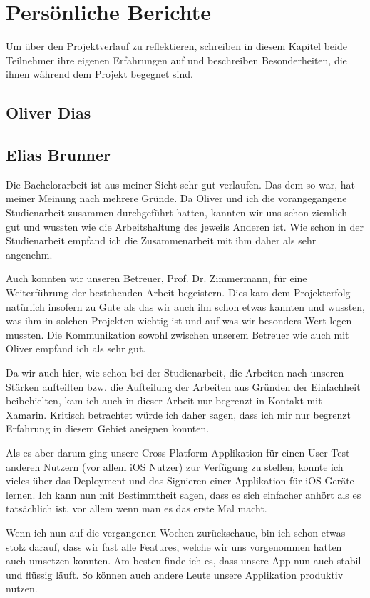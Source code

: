 \section{Persönliche Berichte}
Um über den Projektverlauf zu reflektieren, schreiben in diesem Kapitel beide Teilnehmer ihre eigenen Erfahrungen auf und beschreiben Besonderheiten, die ihnen während dem Projekt begegnet sind. 

\subsection{Oliver Dias}

\subsection{Elias Brunner}
Die Bachelorarbeit ist aus meiner Sicht sehr gut verlaufen. Das dem so war, hat meiner Meinung nach mehrere Gründe. Da Oliver und ich die vorangegangene Studienarbeit zusammen durchgeführt hatten, kannten wir uns schon ziemlich gut und wussten wie die Arbeitshaltung des jeweils Anderen ist. Wie schon in der Studienarbeit empfand ich die Zusammenarbeit mit ihm daher als sehr angenehm.

Auch konnten wir unseren Betreuer, Prof. Dr. Zimmermann, für eine Weiterführung der bestehenden Arbeit begeistern. Dies kam dem Projekterfolg natürlich insofern zu Gute als das wir auch ihn schon etwas kannten und wussten, was ihm in solchen Projekten wichtig ist und auf was wir besonders Wert legen mussten. Die Kommunikation sowohl zwischen unserem Betreuer wie auch mit Oliver empfand ich als sehr gut.

Da wir auch hier, wie schon bei der Studienarbeit, die Arbeiten nach unseren Stärken aufteilten bzw. die Aufteilung der Arbeiten aus Gründen der Einfachheit beibehielten, kam ich auch in dieser Arbeit nur begrenzt in Kontakt mit Xamarin. Kritisch betrachtet würde ich daher sagen, dass ich mir nur begrenzt Erfahrung in diesem Gebiet aneignen konnten. 

Als es aber darum ging unsere Cross-Platform Applikation für einen User Test anderen Nutzern (vor allem iOS Nutzer) zur Verfügung zu stellen, konnte ich vieles über das Deployment und das Signieren einer Applikation für iOS Geräte lernen. Ich kann nun mit Bestimmtheit sagen, dass es sich einfacher anhört als es tatsächlich ist, vor allem wenn man es das erste Mal macht.

Wenn ich nun auf die vergangenen Wochen zurückschaue, bin ich schon etwas stolz darauf, dass wir fast alle Features, welche wir uns vorgenommen hatten auch umsetzen konnten. Am besten finde ich es, dass unsere App nun auch stabil und flüssig läuft. So können auch andere Leute unsere Applikation produktiv nutzen.
 